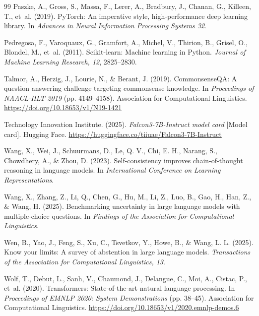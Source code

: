 \documentclass[preprint,12pt,authoryear]{elsarticle}
\begin{document}
\begin{thebibliography}{99}
Paszke, A., Gross, S., Massa, F., Lerer, A., Bradbury, J., Chanan, G., Killeen, T., et~al. (2019). PyTorch: An imperative style, high-performance deep learning library. In \emph{Advances in Neural Information Processing Systems 32}.

Pedregosa, F., Varoquaux, G., Gramfort, A., Michel, V., Thirion, B., Grisel, O., Blondel, M., et~al. (2011). Scikit-learn: Machine learning in Python. \emph{Journal of Machine Learning Research, 12}, 2825--2830.

Talmor, A., Herzig, J., Lourie, N., \& Berant, J. (2019). CommonsenseQA: A question answering challenge targeting commonsense knowledge. In \emph{Proceedings of NAACL-HLT 2019} (pp. 4149--4158). Association for Computational Linguistics. \url{https://doi.org/10.18653/v1/N19-1421}

Technology Innovation Institute. (2025). \emph{Falcon3-7B-Instruct model card} [Model card]. Hugging Face. \url{https://huggingface.co/tiiuae/Falcon3-7B-Instruct}

Wang, X., Wei, J., Schuurmans, D., Le, Q. V., Chi, E. H., Narang, S., Chowdhery, A., \& Zhou, D. (2023). Self-consistency improves chain-of-thought reasoning in language models. In \emph{International Conference on Learning Representations}.

Wang, X., Zhang, Z., Li, Q., Chen, G., Hu, M., Li, Z., Luo, B., Gao, H., Han, Z., \& Wang, H. (2025). Benchmarking uncertainty in large language models with multiple-choice questions. In \emph{Findings of the Association for Computational Linguistics}.

Wen, B., Yao, J., Feng, S., Xu, C., Tsvetkov, Y., Howe, B., \& Wang, L. L. (2025). Know your limits: A survey of abstention in large language models. \emph{Transactions of the Association for Computational Linguistics, 13}.

Wolf, T., Debut, L., Sanh, V., Chaumond, J., Delangue, C., Moi, A., Cistac, P., et~al. (2020). Transformers: State-of-the-art natural language processing. In \emph{Proceedings of EMNLP 2020: System Demonstrations} (pp. 38--45). Association for Computational Linguistics. \url{https://doi.org/10.18653/v1/2020.emnlp-demos.6}


\end{thebibliography}
\end{document}
